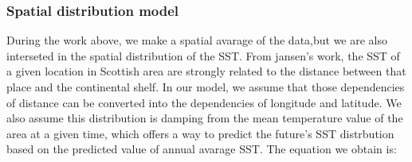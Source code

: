 \documentclass{mcmthesis}
\begin{document}
    \begin{figure}[htbp]
      \centering
      
      \centering
    \end{figure}

  \subsubsection{Spatial distribution model}
    During the work above, we make a spatial avarage of the data,but we are also interseted in the spatial distribution of the SST. From jansen's work\cite{jansen2012migration}, the SST of a given location in Scottish area are strongly related to the distance between that place and the continental shelf. In our model, we assume that those dependencies of distance can be converted into the dependencies of longitude and latitude. We also assume this distribution is damping from the mean temperature value of the area at a given time, which offers a way to predict the future's SST distrbution based on the predicted value of annual avarage SST. 
    The equation we obtain is:
\end{document}
